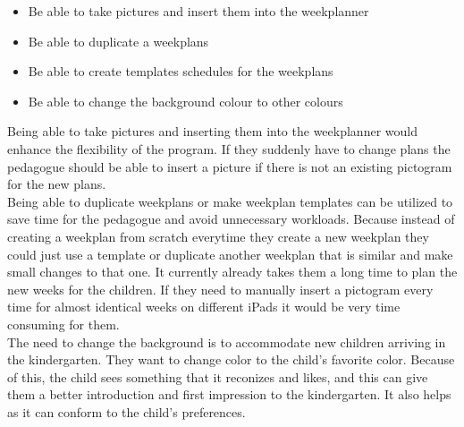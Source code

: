 \begin{itemize}
    \item Be able to take pictures and insert them into the weekplanner
    \item Be able to duplicate a weekplans
    \item Be able to create templates schedules for the weekplans
    \item Be able to change the background colour to other colours
\end{itemize}
\noindent
Being able to take pictures and inserting them into the weekplanner would enhance the flexibility of the program.
If they suddenly have to change plans the pedagogue should be able to insert a picture if there is not an existing pictogram for the new plans.
\\
Being able to duplicate weekplans or make weekplan templates can be utilized to save time for the pedagogue and avoid unnecessary workloads. Because instead of creating a weekplan from scratch everytime they create a new weekplan they could just use a template or duplicate another weekplan that is similar and make small changes to that one. 
It currently already takes them a long time to plan the new weeks for the children. 
If they need to manually insert a pictogram every time for almost identical weeks on different iPads it would be very time consuming for them.
\\
The need to change the background is to accommodate new children arriving in the kindergarten. 
They want to change color to the child's favorite color. 
Because of this, the child sees something that it reconizes and likes, and this can give them a better introduction and first impression to the kindergarten.
It also helps as it can conform to the child's preferences.

